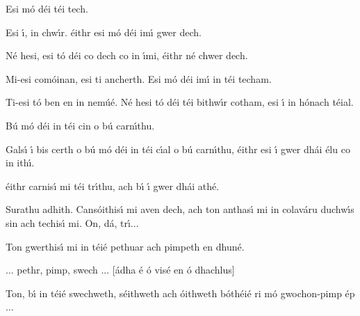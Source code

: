 \begingroup
\fontsize{10pt}{12pt}\selectfont
\begin{leftbubbles}Esi m\'{o} d\'{e}i t\'{e}i tech.\end{leftbubbles}
\begin{rightbubbles}Esi \'{\i}, in chw\'{\i}r. \'{e}ithr esi m\'{o} d\'{e}i im\'{\i} gwer dech.\end{rightbubbles}
\begin{leftbubbles}N\'{e} hesi, esi t\'{o} d\'{e}i co dech co in \'{\i}mi, \'{e}ithr n\'{e} chwer dech.\end{leftbubbles}
\begin{rightbubbles}Mi-esi com\'{o}inan, esi ti ancherth. Esi m\'{o} d\'{e}i im\'{\i} in t\'{e}i techam.\end{rightbubbles}
\begin{leftbubbles}Ti-esi t\'{o} ben en in nem\'{u}\'{e}. N\'{e} hesi t\'{o} d\'{e}i t\'{e}i bithw\'{\i}r cotham, esi \'{\i} in h\'{o}nach t\'{e}ial.\end{leftbubbles}
\begin{rightbubbles}B\'{u} m\'{o} d\'{e}i in t\'{e}i cin o b\'{u} carn\'{\i}thu.\end{rightbubbles}
\begin{leftbubbles}Gals\'{\i} \'{\i} bis certh o b\'{u} m\'{o} d\'{e}i in t\'{e}i c\'{\i}al o b\'{u} carn\'{\i}thu, \'{e}ithr esi \'{\i} gwer dh\'{a}i \'{e}lu co in ith\'{\i}.\end{leftbubbles}
\begin{rightbubbles}\'{e}ithr carnis\'{\i} mi t\'{e}i tr\'{\i}thu, ach b\'{\i} \'{\i} gwer dh\'{a}i ath\'{e}.\end{rightbubbles}
\begin{leftbubbles}Surathu adhith. Cans\'{o}ithis\'{\i} mi aven dech, ach ton anthas\'{\i} mi in colav\'{a}ru duchw\'{\i}s sin ach techis\'{\i} mi. On, d\'{a}, tr\'{\i}...\end{leftbubbles}
\begin{rightbubbles}Ton gwerthis\'{\i} mi in t\'{e}i\'{e} pethuar ach pimpeth en dhun\'{e}.\end{rightbubbles}
\begin{leftbubbles}... pethr, pimp, swech ... [\'{a}dha \'{e} \'{o} vis\'{e} en \'{o} dhachlus]\end{leftbubbles}
\begin{rightbubbles}Ton, b\'{\i} in t\'{e}i\'{e} swechweth, s\'{e}ithweth ach \'{o}ithweth b\'{o}th\'{e}i\'{e} ri m\'{o} gwochon-pimp \'{e}p ...\end{rightbubbles}
